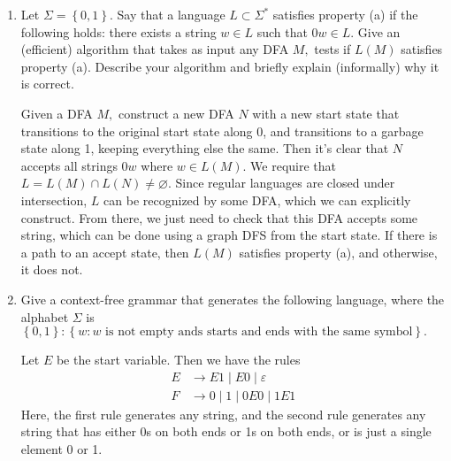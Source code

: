 \documentclass{article}
\begin{document}
\begin{enumerate}
		\newpage
	\item Let $\Sigma=\left\{ 0, 1 \right\}.$ Say that a language $L\subset\Sigma^*$ satisfies property (a) if the following holds: there exists a string $w\in L$ such that $0w\in L.$ Give an (efficient) algorithm that takes as input any DFA $M,$ tests if $L(M)$ satisfies property (a). Describe your algorithm and briefly explain (informally) why it is correct.
		\begin{soln}
			Given a DFA $M,$ construct a new DFA $N$ with a new start state that transitions to the original start state along 0, and transitions to a garbage state along 1, keeping everything else the same. Then it's clear that $N$ accepts all strings $0w$ where $w\in L(M).$ We require that $L=L(M)\cap L(N)\neq\varnothing.$ Since regular languages are closed under intersection, $L$ can be recognized by some DFA, which we can explicitly construct. From there, we just need to check that this DFA accepts some string, which can be done using a graph DFS from the start state. If there is a path to an accept state, then $L(M)$ satisfies property (a), and otherwise, it does not.
		\end{soln}

		\newpage
	\item Give a context-free grammar that generates the following language, where the alphabet $\Sigma$ is $\left\{ 0, 1 \right\}: \left\{ w:w\text{ is not empty ands starts and ends with the same symbol} \right\}.$
		\begin{soln}
			Let $E$ be the start variable. Then we have the rules
			\begin{align*}
				E &\to E1\mid E0\mid \varepsilon \\
				F&\to 0 \mid 1\mid 0E0\mid 1E1
			\end{align*}
			Here, the first rule generates any string, and the second rule generates any string that has either 0s on both ends or 1s on both ends, or is just a single element 0 or 1.
		\end{soln}
		
\end{enumerate}
\end{document}

